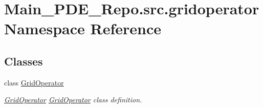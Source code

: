 \hypertarget{namespaceMain__PDE__Repo_1_1src_1_1gridoperator}{}\section{Main\+\_\+\+P\+D\+E\+\_\+\+Repo.\+src.\+gridoperator Namespace Reference}
\label{namespaceMain__PDE__Repo_1_1src_1_1gridoperator}
\subsection*{Classes}
\begin{DoxyCompactItemize}
\item 
class \hyperlink{classMain__PDE__Repo_1_1src_1_1gridoperator_1_1GridOperator}{Grid\+Operator}
\begin{DoxyCompactList}\small\item\em \hyperlink{classMain__PDE__Repo_1_1src_1_1gridoperator_1_1GridOperator}{Grid\+Operator} \hyperlink{classMain__PDE__Repo_1_1src_1_1gridoperator_1_1GridOperator}{Grid\+Operator} class definition. \end{DoxyCompactList}\end{DoxyCompactItemize}
